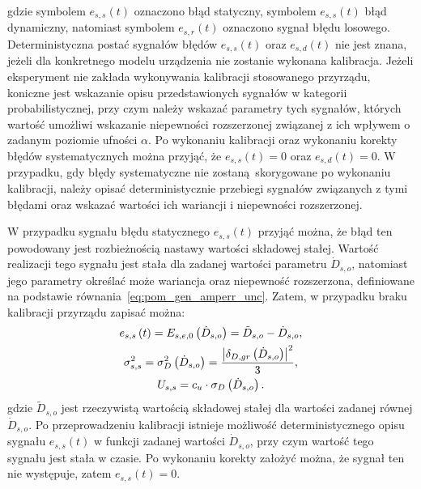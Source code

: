 gdzie symbolem $e_{s,s}(t)$ oznaczono błąd statyczny, symbolem $e_{s,s}(t)$ błąd dynamiczny, natomiast symbolem $e_{s,r}(t)$ oznaczono sygnał błędu losowego. Deterministyczna postać sygnałów błędów $e_{s,s}(t)$ oraz $e_{s,d}(t)$ nie jest znana, jeżeli dla konkretnego modelu urządzenia nie zostanie wykonana kalibracja. Jeżeli eksperyment nie zakłada wykonywania kalibracji stosowanego przyrządu, koniczne jest wskazanie opisu przedstawionych sygnałów w kategorii probabilistycznej, przy czym należy wskazać parametry tych sygnałów, których wartość umożliwi wskazanie niepewności rozszerzonej związanej z ich wpływem o zadanym poziomie ufności $\alpha$. Po wykonaniu kalibracji oraz wykonaniu korekty błędów systematycznych można przyjąć, że $e_{s,s}(t) = 0$ oraz $e_{s,d}(t) = 0$. W przypadku, gdy błędy systematyczne nie zostaną skorygowane po wykonaniu kalibracji, należy opisać deterministycznie przebiegi sygnałów związanych z tymi błędami oraz wskazać wartości ich wariancji i niepewności rozszerzonej.

W przypadku sygnału błędu statycznego $e_{s,s}(t)$ przyjąć można, że błąd ten powodowany jest rozbieżnością nastawy wartości składowej stałej. Wartość realizacji tego sygnału jest stała dla zadanej wartości parametru $\dot{D}_{s,o}$, natomiast jego parametry określać może wariancja oraz niepewność rozszerzona, definiowane na podstawie równania~\eqref{eq:pom_gen_amperr_unc}. Zatem, w przypadku braku kalibracji przyrządu zapisać można:
\begin{gather}
e_{s,s} \left(t\right) = E_{s,e,0} \left(\dot{D}_{s,o}\right) = \tilde{D}_{s,o} - \dot{D}_{s,o} \label{eq:pom_gen_err_stat}, \\
\sigma_{s,s}^{2} = \sigma_{D}^{2} \left(\dot{D}_{s,o}\right) = \frac{\left| \delta_{D,gr} \left(\dot{D}_{s,o}\right) \right|^{2}}{3} \label{eq:pom_gen_var_stat}, \\
U_{s,s} = c_{u} \cdot \sigma_{D} \left(\dot{D}_{s,o}\right) \label{eq:pom_gen_unc_stat}.
\end{gather}
gdzie $\tilde{D}_{s,o}$ jest rzeczywistą wartością składowej stałej dla wartości zadanej równej $\dot{D}_{s,o}$. Po przeprowadzeniu kalibracji istnieje możliwość deterministycznego opisu sygnału $e_{s,s}(t)$ w funkcji zadanej wartości $\dot{D}_{s,o}$, przy czym wartość tego sygnału jest stała w czasie. Po wykonaniu korekty założyć można, że sygnał ten nie występuje, zatem $e_{s,s}(t) = 0$.

